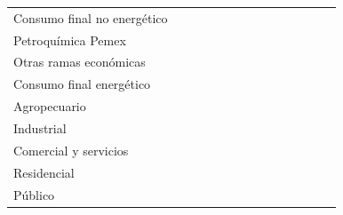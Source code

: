\documentclass{sener2025}
\begin{document}
\begin{tabladoradoLargo}
\begin{xltabular}{\textwidth}{QZZZZZZZZZZZZZ}
    \hspace{1.35em} Consumo final no energético &  &  &  &  &  &  &  &  &  &  &  &  &  \\
    \hspace{2.7em} Petroquímica Pemex &  &  &  &  &  &  &  &  &  &  &  &  &  \\
    \hspace{2.7em} Otras ramas económicas &  &  &  &  &  &  &  &  &  &  &  &  &  \\
    Consumo final energético &  &  &  &  &  &  &  &  &  &  &  &  &  \\
    \hspace{2.7em} Agropecuario &  &  &  &  &  &  &  &  &  &  &  &  &  \\
    \hspace{2.7em} Industrial &  &  &  &  &  &  &  &  &  &  &  &  &  \\
    \hspace{2.7em} Comercial y servicios &  &  &  &  &  &  &  &  &  &  &  &  &  \\
    \hspace{2.7em} Residencial &  &  &  &  &  &  &  &  &  &  &  &  &  \\
    \hspace{2.7em} Público &  &  &  &  &  &  &  &  &  &  &  &  &  \\

\end{xltabular}
\end{tabladoradoLargo}
\end{document}
